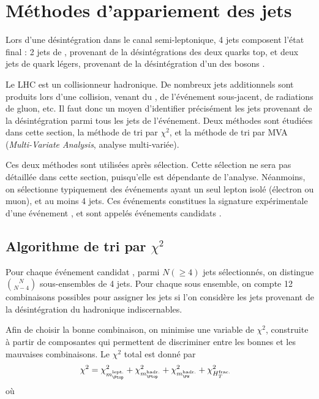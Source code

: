 \section{Méthodes d'appariement des jets}

Lors d'une désintégration \ttbar dans le canal semi-leptonique, 4 jets composent l'état final : 2 jets de \Pbottom, provenant de la désintégrations des deux quarks top, et deux jets de quark légers, provenant de la désintégration d'un des bosons \PW.

Le LHC est un collisionneur hadronique. De nombreux jets additionnels sont produits lors d'une collision, venant du \pu, de l'événement sous-jacent, de radiations de gluon, etc. Il faut donc un moyen d'identifier précisément les jets provenant de la désintégration \ttbar parmi tous les jets de l'événement. Deux méthodes sont étudiées dans cette section, la méthode de tri par $\chi^2$, et la méthode de tri par MVA (\emph{Multi-Variate Analysis}, analyse multi-variée).

\medskip

Ces deux méthodes sont utilisées après sélection. Cette sélection ne sera pas détaillée dans cette section, puisqu'elle est dépendante de l'analyse. Néanmoins, on sélectionne typiquement des événements ayant un seul lepton isolé (électron ou muon), et au moins 4 jets. Ces événements constitues la signature expérimentale d'une événement \ttbar, et sont appelés événements candidats \ttbar.

\subsection{Algorithme de tri par \texorpdfstring{$\chi^2$}{chi²}}

Pour chaque événement candidat \ttbar, parmi $N (\geq 4)$ jets sélectionnés, on distingue $\binom{N}{N - 4}$ sous-ensembles de 4 jets. Pour chaque sous ensemble, on compte 12 combinaisons possibles pour assigner les jets si l'on considère les jets provenant de la désintégration du \PW hadronique indiscernables.

\medskip

Afin de choisir la bonne combinaison, on minimise une variable de $\chi^2$, construite à partir de composantes qui permettent de discriminer entre les bonnes et les mauvaises combinaisons. Le $\chi^2$ total est donné par
\begin{align} \label{eq:chi2}
  \chi^2 &= \chi^2_{m_{\Ptop}^{\text{lept.}}} + \chi^2_{m_{\Ptop}^{\text{hadr.}}} + \chi^2_{m_{\PW}^{\text{hadr.}}} + \chi^2_{H_{T}^{\text{frac.}}}
\end{align}
où


